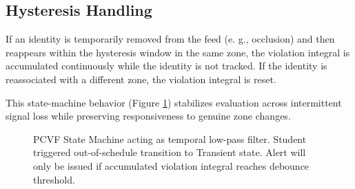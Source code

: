 \documentclass[conference]{IEEEtran}
\begin{document}
\subsection{Hysteresis Handling}
If an identity is temporarily removed from the feed (e. g., occlusion) and then reappears within the hysteresis window in the same zone, the violation integral is accumulated continuously while the identity is not tracked. If the identity is reassociated with a different zone, the violation integral is reset.

This state-machine behavior (Figure \ref{fig:fsm}) stabilizes evaluation across intermittent signal loss while preserving responsiveness to genuine zone changes.

\begin{figure}[htbp]
\centering
{}
\caption{PCVF State Machine acting as temporal low-pass filter. Student triggered out-of-schedule transition to Transient state. Alert will only be issued if accumulated violation integral reaches debounce threshold.}
\label{fig:fsm}
\end{figure}
\end{document}

